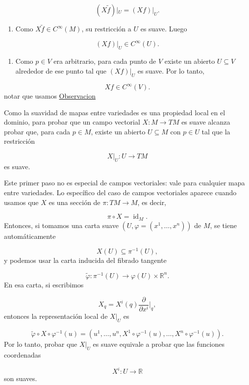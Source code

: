 \begin{bookproof}{}
\[
(X\widetilde f)|_U=(Xf)|_U.
\]
\begin{enumerate}[start=7]
\item Como $X\widetilde f\in C^\infty(M)$, su restricción a $U$ es suave. Luego
\end{enumerate}
\[
(Xf)|_U\in C^\infty(U).
\]
\begin{enumerate}[start=8]
\item Como $p\in V$ era arbitrario, para cada punto de $V$ existe un abierto $U\subseteq V$ alrededor de ese punto tal que $(Xf)|_U$ es suave. Por lo tanto,
\end{enumerate}
\[
Xf\in C^\infty(V).
\]
notar que usamos \hyperref[blk:e32b2f]{Observacion}

\bookqed
\end{bookproof}
\label{blk:3accf8}
\begin{bookremark}{}
Como la suavidad de mapas entre variedades es una propiedad local en el dominio, para probar que un campo vectorial $X:M\to TM$ es suave alcanza probar que, para cada $p\in M$, existe un abierto $U\subseteq M$ con $p\in U$ tal que la restricción

\[
X|_U:U\to TM
\]
es suave.

Este primer paso no es especial de campos vectoriales: vale para cualquier mapa entre variedades. Lo específico del caso de campos vectoriales aparece cuando usamos que $X$ es una sección de $\pi:TM\to M$, es decir,

\[
\pi\circ X=\operatorname{id}_M.
\]
Entonces, si tomamos una carta suave $(U,\varphi=(x^1,\ldots,x^n))$ de $M$, se tiene automáticamente

\[
X(U)\subseteq \pi^{-1}(U),
\]
y podemos usar la carta inducida del fibrado tangente

\[
\widetilde\varphi:\pi^{-1}(U)\to\varphi(U)\times\mathbb R^n.
\]
En esa carta, si escribimos

\[
X_q=X^i(q)\frac{\partial}{\partial x^i}\bigg|_q,
\]
entonces la representación local de $X|_U$ es

\[
\widetilde\varphi\circ X\circ\varphi^{-1}(u)=\left(u^1,\ldots,u^n,X^1\circ\varphi^{-1}(u),\ldots,X^n\circ\varphi^{-1}(u)\right).
\]
Por lo tanto, probar que $X|_U$ es suave equivale a probar que las funciones coordenadas

\[
X^i:U\to\mathbb R
\]
son suaves.

\end{bookremark}
\label{blk:e32b2f}
